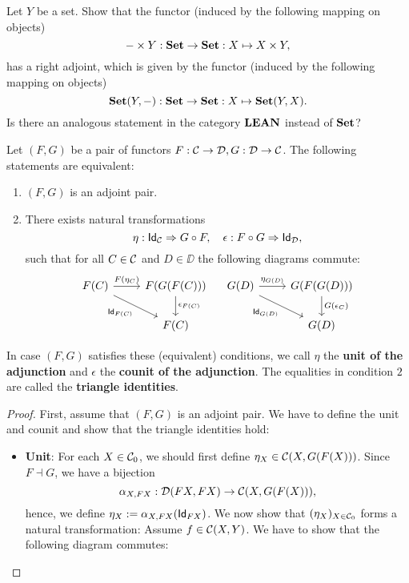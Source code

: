 \begin{exer}\label{exer:adjunction_homtensor_currying} Let $Y$ be a set. Show that the functor (induced by the following mapping on objects)
\[
- \times Y : \SET\to \SET: X\mapsto X\times Y,
\]
has a right adjoint, which is given by the functor (induced by the following mapping on objects)
\[
\CHom{\SET}{Y}{-} : \SET\to\SET : X\mapsto \CHom{\SET}{Y}{X}.
\]
Is there an analogous statement in the category $\LEAN$ instead of $\SET$?
\end{exer}

\begin{thm} Let $(F,G)$ be a pair of functors $F : \CC\to\DD, G: \DD\to\CC$. The following statements are equivalent:
\begin{enumerate}
\item $(F,G)$ is an adjoint pair.
\item There exists natural transformations 
\[
\NatTrans{\eta}{\Id[\CC]}{\co{F}{G}}, \quad \NatTrans{\epsilon}{\co{G}{F}}{\Id[\DD]},
\]
such that for all $C\in\CC$ and $D\in\DD$ the following diagrams commute:
\[
\begin{tikzcd}
F(C) \arrow[r,"{F(\eta_C)}"] \arrow[rd,swap, "{\Id[F(C)]}"] & F(G(F(C))) \arrow[d, "{\epsilon_{F(C)}}"] \\
& F(C)
\end{tikzcd} \quad 
\begin{tikzcd}
G(D) \arrow[r,"{\eta_{G(D)}}"] \arrow[rd,swap, "{\Id[G(D)]}"] & G(F(G(D))) \arrow[d, "{G(\epsilon_{C})}"] \\
& G(D)
\end{tikzcd}
\]
\end{enumerate}
In case $(F,G)$ satisfies these (equivalent) conditions, we call $\eta$ the \textbf{unit of the adjunction} and $\epsilon$ the \textbf{counit of the adjunction}. The equalities in condition $2$ are called the \textbf{triangle identities}.
\begin{proof}
First, assume that $(F,G)$ is an adjoint pair. We have to define the unit and counit and show that the triangle identities hold:
\begin{itemize}
\item \textbf{Unit}: For each $X\in\Ob{\CC}$, we should first define $\eta_X \in \CHom{\CC}{X}{G(F(X))}$. Since $F \dashv G$, we have a bijection
\[
\alpha_{X,FX} : \CHom{\DD}{FX}{FX} \to \CHom{\CC}{X}{G(F(X))},
\]
hence, we define $\eta_X := \alpha_{X,FX}(\Id[FX])$. We now show that $(\eta_X)_{X\in\Ob{\CC}}$ forms a natural transformation: Assume $f\in\CHom{\CC}{X}{Y}$. We have to show that the following diagram commutes:

\end{itemize}
\end{proof}
\end{thm}

